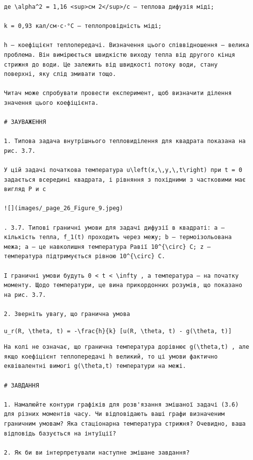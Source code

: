 \documentclass[
  ukrainian,
]{article}
\begin{document}
\begin{verbatim}
де \alpha^2 = 1,16 <sup>см 2</sup>/с — теплова дифузія міді;

k = 0,93 кал/см·с·°C — теплопровідність міді;

h — коефіцієнт теплопередачі. Визначення цього співвідношення — велика проблема. Він вимірюється швидкістю виходу тепла від другого кінця стрижня до води. Це залежить від швидкості потоку води, стану поверхні, яку слід змивати тощо.

Читач може спробувати провести експеримент, щоб визначити ділення значення цього коефіцієнта.

# ЗАУВАЖЕННЯ

1. Типова задача внутрішнього тепловиділення для квадрата показана на рис. 3.7.

У цій задачі початкова температура u\left(x,\,y,\,t\right) при t = 0 задається всередині квадрата, і рівняння з похідними з частковими має вигляд Р и с

![](images/_page_26_Figure_9.jpeg)

. 3.7. Типові граничні умови для задачі дифузії в квадраті: a — кількість тепла, f_1(t) проходить через межу; b — термоізольована межа; a — це навколишня температура Равії 10^{\circ} C; z — температура підтримується рівною 10^{\circ} C.

І граничні умови будуть 0 < t < \infty , а температура — на початку моменту. Щодо температури, це вина прикордонних розумів, що показано на рис. 3.7.

2. Зверніть увагу, що гранична умова
\end{verbatim}

\texttt{u\_r(R,\ \textbackslash{}theta,\ t)\ =\ -\textbackslash{}frac\{h\}\{k\}\ {[}u(R,\ \textbackslash{}theta,\ t)\ -\ g(\textbackslash{}theta,\ t){]}}

\begin{verbatim}
На колі не означає, що гранична температура дорівнює g(\theta,t) , але якщо коефіцієнт теплопередачі h великий, то ці умови фактично еквівалентні вимогі g(\theta,t) температури на межі.

# ЗАВДАННЯ

1. Намалюйте контури графіків для розв'язання змішаної задачі (3.6) для різних моментів часу. Чи відповідають ваші графи визначеним граничним умовам? Яка стаціонарна температура стрижня? Очевидно, ваша відповідь базується на інтуїції?

2. Як би ви інтерпретували наступне змішане завдання?
\end{verbatim}
\end{document}
